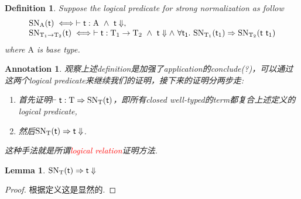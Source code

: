 \documentclass{article}
\theoremstyle{plain}
\newtheorem{lemma}[theorem]{Lemma}
\newtheorem{definition}[theorem]{Definition}
\newtheorem{annotation}[theorem]{Annotation}
\theoremstyle{nonumberplain}
\newtheorem{proof}{Proof}
\newcommand{\singletype}[1]{\text{#1}}
\newcommand{\termtype}[2]{\ensuremath{#1:#2}}
\newcommand{\term}[1]{\ensuremath\mathsf{#1}}
\newcommand{\redt}[1]{\textcolor{red}{#1}}
\begin{document}
\begin{definition}\label{logical predicate of SN}
\rm Suppose the logical predicate for strong normalization as follow
$$
\begin{array}{ll}
\text{SN}_{\singletype{A}}(\term{t}) \iff \vdash \termtype{\term{t}}{\singletype{A}} ~\wedge~ \term{t}\Downarrow,\\
\text{SN}_{\singletype{T}_1 \to \singletype{T}_2}(\term{t}) \iff \vdash \termtype{\term{t}}{\singletype{T}_1 \to \singletype{T}_2} ~\wedge~ \term{t}\Downarrow \wedge ~\forall \term{t_1}.~\text{SN}_{\singletype{T}_1}(\term{t}_1) \Rightarrow \text{SN}_{\singletype{T}_2}(\term{t}~\term{t}_1)
\end{array} 
$$
where $\singletype{A}$ is base type. 
\end{definition}

\begin{annotation}
\rm 观察上述definition是加强了application的conclude(?)，可以通过这两个logical predicate来继续我们的证明，接下来的证明分两步走:
\begin{enumerate}
	\item 首先证明$\vdash \termtype{\term{t}}{\singletype{T}} \Rightarrow \text{SN}_\singletype{T}(\term{t})$，即所有closed well-typed的term都复合上述定义的logical predicate,
	\item 然后$\text{SN}_\singletype{T}(\term{t}) \Rightarrow \term{t}\Downarrow$.
\end{enumerate}
这种手法就是所谓\redt{logical relation}证明方法. 
\end{annotation}

\begin{lemma}\label{logical predicate well-defined}
\rm $\text{SN}_\singletype{T}(\term{t}) \Rightarrow \term{t}\Downarrow$
\end{lemma}

\begin{proof}
根据定义这是显然的. 
\end{proof}
\end{document}
